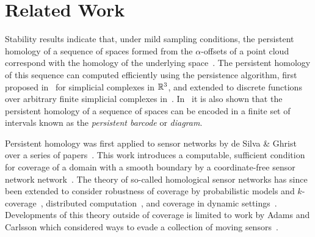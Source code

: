 
\section{Related Work}
\label{sec:related}

Stability results indicate that, under mild sampling conditions, the persistent homology of a sequence of spaces formed from the $\alpha$-offsets of a point cloud correspond with the homology of the underlying space~\cite{cohensteiner07stability}.
The persistent homology of this sequence can computed efficiently using the persistence algorithm, first proposed in~\cite{edelsbrunner02simplification} for simplicial complexes in $\mathbb{R}^3$, and extended to discrete functions over arbitrary finite simplicial complexes in~\cite{zomorodian05computing}.
In~\cite{zomorodian05computing} it is also shown that the persistent homology of a sequence of spaces can be encoded in a finite set of intervals known as the \emph{persistent barcode} or \emph{diagram}.


Persistent homology was first applied to sensor networks by de Silva \& Ghrist over a series of papers~\cite{ghrist05coverage,desilva06coordinate,desilva07homological,desilva07coverage}.
This work introduces a computable, sufficient condition for coverage of a domain with a smooth boundary by a coordinate-free sensor network network~\cite{desilva07coverage}.
The theory of so-called homological sensor networks has since been extended to consider robustness of coverage by probabilistic models and $k$-coverage~\cite{munch12failure,cavanna2017when}, distributed computation~\cite{dlotko12distributed}, and coverage in dynamic settings~\cite{gamble12applied,gamble14coordinate}.
Developments of this theory outside of coverage is limited to work by Adams and Carlsson which considered ways to evade a collection of moving sensors~\cite{adams13evasion}.

